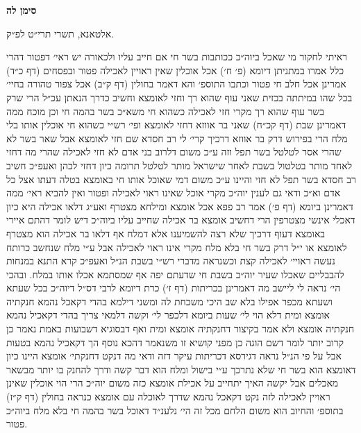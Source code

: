 \documentclass[12pt, openany]{book}
\newcommand{\chapname}{}
\newcommand{\newchap}[1]{
	\addcontentsline{toc}{chapter}{#1}
	\renewcommand{\chapname}{#1}
		\begin{center}
			\textbf{%
\fontsize{16pt}{16pt}\selectfont
				#1}
		\end{center}
}
\begin{document}
\newchap{סימן לה}
\begin{multicols}{2}
אלטאנא, תשרי תרי״ט לפ״ק.\\\vspace{0pt}

ראיתי לחקור מי שאכל ביוה״כ ככותבות בשר חי אם חייב עליו ולכאורה יש ראי׳ דפטור דהרי כלל אמרו במתניתן דיומא (פ׳ ח׳) אכל אוכלין שאין ראויין לאכילה פטור ובפסחים (דף כ״ד) אמרינן אכל חלב חי פטור וכתבו התוספ׳ והא דאמר בחולין (דף ק״ב) אכל צפור טהורה בחיי׳ בכל שהו במיתתה בכזית שאני עוף שהוא רך וחזי לאומצא וחשיב כדרך הנאתן עכ״ל הרי שרק בשר עוף שהוא רך מקרי חזי לאכילה כשהוא חי משא״כ בשר בהמה חי וכן מוכח ממה דאמרינן שבת (דף קכ״ח) שאני בר אווזא דחזי לאומצא ופי׳ רש״י כשהוא חי אוכלין אותו בלי מלח הרי בפירוש דרק בר אווזא דרכיך קרי׳ לי רב חסדא שם חזי לאומצא אבל שאר בשר לא שהרי אסר לטלטל בשר תפל וזה ע״כ משום דלרוב בני אדם לא חזי לאכילה שהרי מה דחזי לאחד מותר בטלטול בשבת לאחר שישראל מותר לטלטל תרומה כיון דחזי לכהן ואעפ״כ חשיב רב חסדא בשר תפל לא חזי והיינו ע״כ משום דמי שאוכל אותו חי באומצא בטלה דעתו אצל כל אדם וא״כ ודאי גם לענין יוה״כ מקרי אוכל שאינו ראוי לאכילה ופטור ואין להביא ראי׳ ממה דאמרינן ביומא (דף פ׳) אמר רב פפא אכל אומצא ומילחא מצטרף ואע״ג דלאו אכילה היא כיון דאכלי אינשי מצטרפין הרי דחשיב אומצא בר אכילה שחייב עליו ביוה״כ דיש לומר דהתם איירי באומצא דעוף דרכיך שלא רצה להשמיענו אלא דמלח אף דלאו בר אכילה הוא מצטרף לאומצא או י״ל דרק בשר חי בלא מלח מקרי אינו ראוי לאכילה אבל ע״י מלח שנחשב כרותח נעשה ראויי׳ לאכילה קצת וכשנראה מדברי רש״י בשבת הנ״ל ואעפ״כ קרא התנא במנחות להבבליים שאכלו שעיר יוה״כ בשבת חי שדעתם יפה אף שמסתמא אכלו אותו במלח. ובהכי הי׳ נראה לי ליישב מה דאמרינן בכריתות (דף ז׳) כרת דיומא לרבי דס״ל דיוה״כ בכל שעתא ושעתא מכפר אפילו בלא שב היכי משכחת לה ומשני דילמא בהדי דקאכל נהמא חנקתיה אומצא ומית דלא הוי לי׳ שעות ביומא דלכפר לי׳ וקשה דלמאי צריך בהדי דקאכיל נהמא חנקתיה אומצא ולא אמר בקיצור דחנקתיה אומצא ומית ואף דבסוגיא דשבועות באמת נאמר כן קרוב יותר לומר דשם הוגה כן מפני קושיא זו משנאמר דהכא נוסף הך דקאכיל נהמא בטעות אבל על פי הנ״ל נראה דגירסא דכריתות עיקר דזה ודאי מה דנקט דחנקתי׳ אומצא היינו כיון דאומצא הוא בשר חי שלא נתרכך ע״י בישול ומלח הוא דבר קשה ודרך להחנק בו יותר מבשאר מאכלים אבל יקשה האיך יתחייב על אכילת אומצא כזה משום יוה״כ הרי הוי אוכלין שאינן ראויין לאכילה לזה נקט דקאכל נהמא שדרך לאוכלה עם אומצא כנראה בחולין (דף ק״ז) בתוספ׳ והחיוב הוא משום הלחם מכל זה הי׳ נלענ״ד דאוכל בשר בהמה חי בלא מלח ביוה״כ פטור.\\\vspace{0pt}


\end{multicols}
\end{document}
